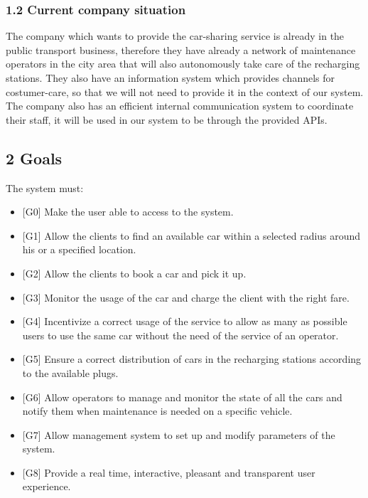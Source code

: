 \documentclass[]{article}
\providecommand{\tightlist}{%
  \setlength{\itemsep}{0pt}\setlength{\parskip}{0pt}}
\begin{document}
\subsubsection{1.2 Current company
situation}\label{current-company-situation}

The company which wants to provide the car-sharing service is already in
the public transport business, therefore they have already a network of
maintenance operators in the city area that will also autonomously take
care of the recharging stations. They also have an information system
which provides channels for costumer-care, so that we will not need to
provide it in the context of our system. The company also has an
efficient internal communication system to coordinate their staff, it
will be used in our system to be through the provided APIs.

\subsection{2 Goals}\label{goals}

The system must:

\begin{itemize}
\tightlist
\item
  {[}G0{]} Make the user able to access to the system.
\item
  {[}G1{]} Allow the clients to find an available car within a selected
  radius around his or a specified location.
\item
  {[}G2{]} Allow the clients to book a car and pick it up.
\item
  {[}G3{]} Monitor the usage of the car and charge the client with the
  right fare.
\item
  {[}G4{]} Incentivize a correct usage of the service to allow as many
  as possible users to use the same car without the need of the service
  of an operator.
\item
  {[}G5{]} Ensure a correct distribution of cars in the recharging
  stations according to the available plugs.
\item
  {[}G6{]} Allow operators to manage and monitor the state of all the
  cars and notify them when maintenance is needed on a specific vehicle.
\item
  {[}G7{]} Allow management system to set up and modify parameters of
  the system.
\item
  {[}G8{]} Provide a real time, interactive, pleasant and transparent
  user experience.
\end{itemize}
\end{document}
